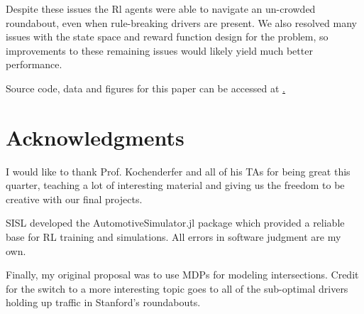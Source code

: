 \documentclass[conference]{IEEEtran}
\begin{document}
Despite these issues the Rl agents were able to navigate an un-crowded roundabout, even when rule-breaking drivers are present. We also resolved many issues with the state space and reward function design for the problem, so improvements to these remaining issues would likely yield much better performance.

Source code, data and figures for this paper can be accessed at \href{}. %

\section*{Acknowledgments}
I would like to thank Prof. Kochenderfer and all of his TAs for being great this quarter, teaching a lot of interesting material and giving us the freedom to be creative with our final projects.

SISL developed the AutomotiveSimulator.jl package which provided a reliable base for RL training and simulations. All errors in software judgment are my own.

Finally, my original proposal was to use MDPs for modeling intersections. Credit for the switch to a more interesting topic goes to all of the sub-optimal drivers holding up traffic in Stanford's roundabouts.
\vspace{4em}\\
~
\\
\vspace{11em}


\end{document}
